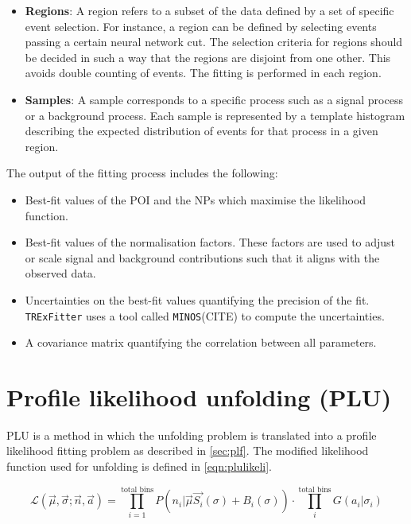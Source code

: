 \begin{itemize}
    \item \textbf{Regions}: A region refers to a subset of the data defined by a set of
    specific event selection. For instance, a region can be defined by selecting events passing
    a certain neural network cut. The selection criteria for regions should be decided in such a 
    way that the regions are disjoint from one other. This avoids double counting of events. The 
    fitting is performed in each region.

    \item \textbf{Samples}: A sample corresponds to a specific process such as a signal process
    or a background process. Each sample is represented by a template histogram describing the 
    expected distribution of events for that process in a given region. 

\end{itemize}

The output of the fitting process includes the following:

\begin{itemize}
\item Best-fit values of the POI and the NPs which maximise the likelihood function.
\item Best-fit values of the normalisation factors. These factors are used to adjust or scale
signal and background contributions such that it aligns with the observed data.
\item Uncertainties on the best-fit values quantifying the precision of the fit. \texttt{TRExFitter}
uses a tool called \texttt{MINOS}(CITE) to compute the uncertainties.
\item A covariance matrix quantifying the correlation between all parameters.
\end{itemize}

\section{Profile likelihood unfolding (PLU)}
PLU is a method in which the unfolding problem is translated into a 
profile likelihood fitting problem as described in \cref{sec:plf}.   
The modified likelihood function used for unfolding is defined in
\cref{eqn:plulikeli}.

\begin{equation}
    \mathcal{L}(\vec{\mu},\vec{\sigma} ; \vec{n},\vec{a}) = \prod_{i=1}^{\text{total bins}} P(n_i|\vec{\mu} \vec{S_i}(\sigma)+B_i(\sigma)) \cdot \prod_{i}^{\text{total bins}} G(a_i|\sigma_i)
    \label{eqn:plulikeli}
\end{equation}

